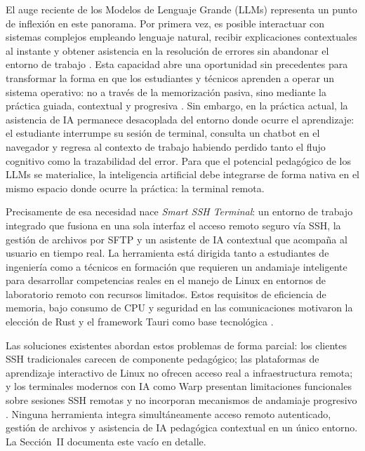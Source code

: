 \documentclass[conference]{IEEEtran} %
\begin{document}
El auge reciente de los Modelos de Lenguaje Grande (LLMs) representa un 
punto de inflexión en este panorama. Por primera vez, es posible interactuar 
con sistemas complejos empleando lenguaje natural, recibir explicaciones 
contextuales al instante y obtener asistencia en la resolución de errores 
sin abandonar el entorno de trabajo \cite{brown2020language, chen2021evaluating}. 
Esta capacidad abre una oportunidad sin precedentes para transformar la 
forma en que los estudiantes y técnicos aprenden a operar un sistema 
operativo: no a través de la memorización pasiva, sino mediante la práctica 
guiada, contextual y progresiva \cite{denny2023conversing}. Sin embargo, en 
la práctica actual, la asistencia de IA permanece desacoplada del entorno 
donde ocurre el aprendizaje: el estudiante interrumpe su sesión de terminal, 
consulta un chatbot en el navegador y regresa al contexto de trabajo habiendo 
perdido tanto el flujo cognitivo como la trazabilidad del error. Para que el 
potencial pedagógico de los LLMs se materialice, la inteligencia artificial 
debe integrarse de forma nativa en el mismo espacio donde ocurre la 
práctica: la terminal remota. 

Precisamente de esa necesidad nace \textit{Smart SSH Terminal}: un entorno 
de trabajo integrado que fusiona en una sola interfaz el acceso remoto 
seguro vía SSH, la gestión de archivos por SFTP y un asistente de IA 
contextual que acompaña al usuario en tiempo real. La herramienta está 
dirigida tanto a estudiantes de ingeniería como a técnicos en formación que 
requieren un andamiaje inteligente para desarrollar competencias reales en 
el manejo de Linux en entornos de laboratorio remoto con recursos limitados. 
Estos requisitos de eficiencia de memoria, bajo consumo de CPU y seguridad 
en las comunicaciones motivaron la elección de Rust y el framework Tauri 
como base tecnológica \cite{klabnik2019rust}. 

Las soluciones existentes abordan estos problemas de forma parcial: los 
clientes SSH tradicionales carecen de componente pedagógico; las plataformas 
de aprendizaje interactivo de Linux no ofrecen acceso real a infraestructura 
remota; y los terminales modernos con IA como Warp presentan limitaciones 
funcionales sobre sesiones SSH remotas y no incorporan mecanismos de 
andamiaje progresivo \cite{warp2024ssh}. Ninguna herramienta integra 
simultáneamente acceso remoto autenticado, gestión de archivos y asistencia 
de IA pedagógica contextual en un único entorno. La Sección~II documenta 
este vacío en detalle. 
\end{document}

